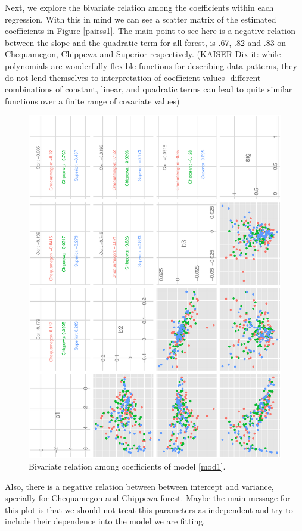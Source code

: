 \documentclass{article}
\begin{document}
Next, we explore the bivariate relation among the coefficients within each regression. With this in mind we can see a scatter matrix of the estimated coefficients in Figure \ref{pairss1}. The main point to see here is a negative relation between the slope and the quadratic term for all forest, is .67, .82 and .83 on Chequamegon, Chippewa and Superior respectively. (KAISER Dix it: while polynomials are wonderfully flexible functions for describing data patterns, they do not lend themselves to interpretation of coefficient values -different combinations of constant, linear, and quadratic terms can lead to quite similar functions over a finite range of covariate values) 

\begin{figure}[h!]
\centering
\includegraphics[scale=.6, angle=-90]{scat_m1.ps}
\caption{Bivariate relation among coefficients of model \ref{mod1}. \label{pairs1}}
\end{figure}
Also, there is a negative relation between between intercept and variance, specially for Chequamegon and Chippewa forest. Maybe the main message for this plot is that we should not treat this parameters as independent and try to include their dependence into the model we are fitting. 
\end{document}
